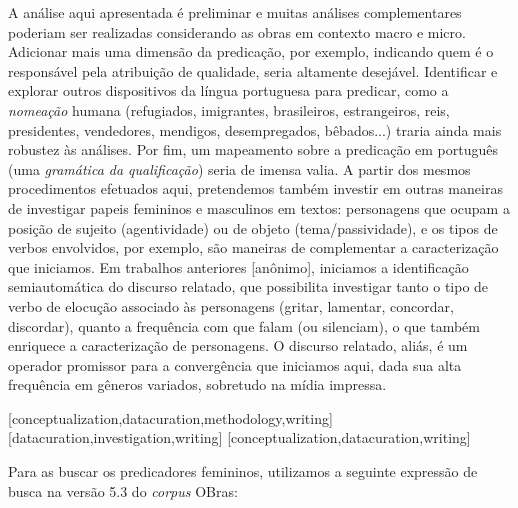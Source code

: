 \documentclass[portuguese]{textolivre}
\begin{document}
A análise aqui apresentada é preliminar e muitas análises complementares poderiam ser realizadas considerando as obras em contexto macro e micro. Adicionar mais uma dimensão da predicação, por exemplo, indicando quem é o responsável pela atribuição de qualidade, seria altamente desejável. Identificar e explorar outros dispositivos da língua portuguesa para predicar, como a \textit{nomeação} humana (refugiados, imigrantes, brasileiros, estrangeiros, reis, presidentes, vendedores, mendigos, desempregados, bêbados...) traria ainda mais robustez às análises. Por fim, um mapeamento sobre a predicação em português (uma \textit{gramática da qualificação}) seria de imensa valia. A partir dos mesmos procedimentos efetuados aqui, pretendemos também investir em outras maneiras de investigar papeis femininos e masculinos em textos: personagens que ocupam a posição de sujeito (agentividade) ou de objeto (tema/passividade), e os tipos de verbos envolvidos, por exemplo, são maneiras de complementar a caracterização que iniciamos. Em trabalhos anteriores [anônimo], iniciamos a identificação semiautomática do discurso relatado, que possibilita investigar tanto o tipo de verbo de elocução associado às personagens (gritar, lamentar, concordar, discordar), quanto a frequência com que falam (ou silenciam), o que também enriquece a caracterização de personagens. O discurso relatado, aliás, é um operador promissor para a convergência que iniciamos aqui, dada sua alta frequência em gêneros variados, sobretudo na mídia impressa.

\printbibliography\label{sec-bib}


\begin{contributors}
[conceptualization,datacuration,methodology,writing]
[datacuration,investigation,writing]
[conceptualization,datacuration,writing]
\end{contributors}


\appendix 
Para as buscar os predicadores femininos, utilizamos a seguinte expressão de busca na versão 5.3 do \textit{corpus} OBras:
\end{document}
